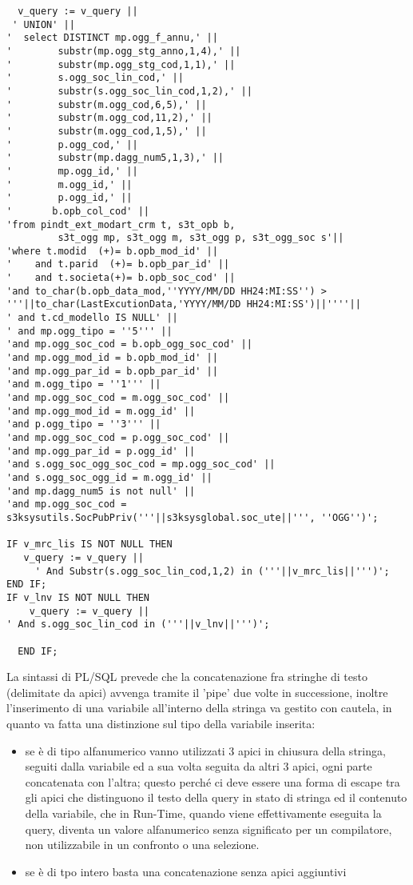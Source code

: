 \begin{lstlisting}
  v_query := v_query ||
 ' UNION' ||
'  select DISTINCT mp.ogg_f_annu,' ||
'        substr(mp.ogg_stg_anno,1,4),' ||
'        substr(mp.ogg_stg_cod,1,1),' ||
'        s.ogg_soc_lin_cod,' ||
'        substr(s.ogg_soc_lin_cod,1,2),' ||
'        substr(m.ogg_cod,6,5),' ||
'        substr(m.ogg_cod,11,2),' ||
'        substr(m.ogg_cod,1,5),' ||
'        p.ogg_cod,' ||
'        substr(mp.dagg_num5,1,3),' ||
'        mp.ogg_id,' ||
'        m.ogg_id,' ||
'        p.ogg_id,' ||
'       b.opb_col_cod' ||
'from pindt_ext_modart_crm t, s3t_opb b, 
         s3t_ogg mp, s3t_ogg m, s3t_ogg p, s3t_ogg_soc s'|| 
'where t.modid  (+)= b.opb_mod_id' ||
'    and t.parid  (+)= b.opb_par_id' ||
'    and t.societa(+)= b.opb_soc_cod' ||
'and to_char(b.opb_data_mod,''YYYY/MM/DD HH24:MI:SS'') > 
'''||to_char(LastExcutionData,'YYYY/MM/DD HH24:MI:SS')||''''|| 
' and t.cd_modello IS NULL' ||
' and mp.ogg_tipo = ''5''' ||
'and mp.ogg_soc_cod = b.opb_ogg_soc_cod' ||
'and mp.ogg_mod_id = b.opb_mod_id' ||
'and mp.ogg_par_id = b.opb_par_id' ||
'and m.ogg_tipo = ''1''' ||
'and mp.ogg_soc_cod = m.ogg_soc_cod' ||
'and mp.ogg_mod_id = m.ogg_id' ||
'and p.ogg_tipo = ''3''' ||
'and mp.ogg_soc_cod = p.ogg_soc_cod' ||
'and mp.ogg_par_id = p.ogg_id' ||
'and s.ogg_soc_ogg_soc_cod = mp.ogg_soc_cod' ||
'and s.ogg_soc_ogg_id = m.ogg_id' ||
'and mp.dagg_num5 is not null' ||
'and mp.ogg_soc_cod = 
s3ksysutils.SocPubPriv('''||s3ksysglobal.soc_ute||''', ''OGG'')';

IF v_mrc_lis IS NOT NULL THEN
   v_query := v_query || 
     ' And Substr(s.ogg_soc_lin_cod,1,2) in ('''||v_mrc_lis||''')';
END IF;
IF v_lnv IS NOT NULL THEN
    v_query := v_query || 
' And s.ogg_soc_lin_cod in ('''||v_lnv||''')';
    
  END IF;
\end{lstlisting}
La sintassi di PL/SQL prevede che la concatenazione fra stringhe di testo (delimitate da apici) avvenga tramite il 'pipe' due volte in successione, inoltre l'inserimento di una variabile all'interno della stringa va gestito con cautela, in quanto va fatta una distinzione sul tipo della variabile inserita: \\
\begin{itemize}
\item se è di tipo alfanumerico vanno utilizzati 3 apici in chiusura della stringa, seguiti dalla variabile ed a sua volta seguita da altri 3 apici, ogni parte concatenata con l'altra; questo perché ci deve essere una forma di escape tra gli apici che distinguono il testo della query in stato di stringa ed il contenuto della variabile, che in Run-Time, quando viene effettivamente eseguita la query, diventa un valore alfanumerico senza significato per un compilatore, non utilizzabile in un confronto o una selezione.\\
\item se è di tpo intero basta una concatenazione senza apici aggiuntivi
\end{itemize}


